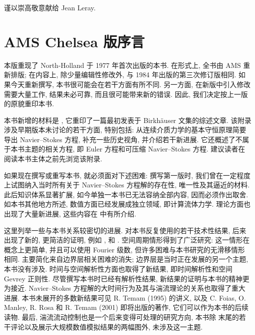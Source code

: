 \clearpage
\thispagestyle{empty}
\label{front:dedication}
\vspace*{0.36\textheight}
\begin{center}
  谨以崇高敬意献给 Jean Leray.
\end{center}
\clearpage

\label{front:contents}
\tableofcontents
\clearpage

\section*{AMS Chelsea 版序言}
\label{front:preface-ams-chelsea}

本版重现了 North-Holland 于 1977 年首次出版的本书. 在形式上, 全书由 AMS 重新排版; 在内容上, 除少量编辑性修改外, 与 1984 年出版的第三次修订版相同. 如果今天重新撰写, 本书很可能会在若干方面有所不同. 另一方面, 在新版中引入修改需要大量工作, 结果未必可靠, 而且很可能带来新的错误. 因此, 我们决定按上一版的原貌重印本书.

本书新增的材料是 , 它重印了一篇最初发表于 Birkhäuser 文集的综述文章. 该附录涉及早期版本未讨论的若干方面, 特别包括: 从连续介质力学的基本守恒原理简要导出 Navier--Stokes 方程, 补充一些历史视角, 并介绍若干新进展. 它还概述了不属于本书主题的相关方程, 即 Euler 方程和可压缩 Navier--Stokes 方程. 建议读者在阅读本书主体之前先浏览该附录.

如果现在撰写或重写本书, 就必须面对下述困难: 撰写第一版时, 我们曾在一定程度上试图纳入当时所有关于 Navier--Stokes 方程解的存在性, 唯一性及其逼近的材料. 此后知识体系显著扩展, 如今单独一本书已无法容纳全部内容, 因而必须作出取舍. 如本书其他地方所述, 数值方面已经发展成独立领域, 即计算流体力学. 理论方面也出现了大量新进展, 这些内容在  中有所介绍.

这里列举一些与本书关系较密切的进展. 对本书反复使用的若干技术性结果, 后来出现了新的, 更简洁的证明, 例如 ,  和 . 空间周期情形得到了广泛研究: 这一情形在概念上更简单, 并且可以使用 Fourier 级数, 但许多困难与本书研究的无滑移情形相同. 主要简化来自边界层相关困难的消失; 边界层是当时正在发展的另一个主题, 本书没有涉及. 时间与空间解析性方面也取得了新结果, 即时间解析性和空间 Gevrey 正则性. 尽管撰写本书时已经有解析性结果, 新结果的证明与本书的精神更为接近. Navier--Stokes 方程解的大时间行为及其与湍流理论的关系也取得了重大进展. 本书未展开的多数新结果可见 R. Temam (1995) 的讲义, 以及 C. Foias, O. Manley, R. Rosa 和 R. Temam (2001) 即将出版的著作, 它们可以作为本书的后续读物. 最后, 湍流流动控制也是一个后来变得可处理的研究方向, 本书除  末尾的若干评论以及展示大规模数值模拟结果的两幅图外, 未涉及这一主题.

